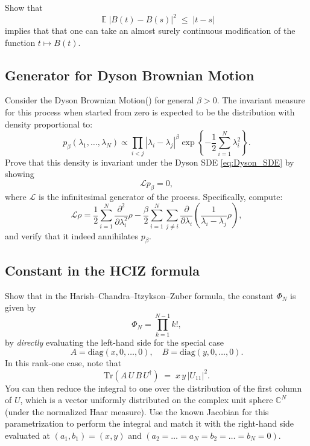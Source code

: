 \documentclass[letterpaper,11pt,oneside,reqno]{article}
\numberwithin{equation}{section}
\theoremstyle{definition}
\begin{document}
Show that
\begin{equation*}
	\operatorname{\mathbb{E}}|B(t)-B(s)|^2 \;\le\; |t-s|
\end{equation*}
implies that
that one can take an almost
surely continuous modification of the function $t\mapsto B(t)$.

\subsection{Generator for Dyson Brownian Motion}
\label{prob:generator}

Consider the Dyson Brownian Motion() for general $\beta > 0$. The invariant measure for this process when started from zero is expected to be the distribution with density proportional to:
\begin{equation*}
p_{\beta}(\lambda_1,\ldots,\lambda_N) \propto \prod_{i<j}|\lambda_i-\lambda_j|^{\beta} \exp\left\{-\frac{1}{2}\sum_{i=1}^N \lambda_i^2\right\}.
\end{equation*}
Prove that this density is invariant under the Dyson SDE \eqref{eq:Dyson_SDE} by showing
\begin{equation*}
\mathcal{L}p_{\beta} = 0,
\end{equation*}
where $\mathcal{L}$ is the infinitesimal generator of the process. Specifically, compute:
\begin{equation*}
\mathcal{L}\rho = \frac{1}{2}\sum_{i=1}^N
\frac{\partial^2}{\partial \lambda_i^2} \rho-
\frac{\beta}{2}\sum_{i=1}^N\sum_{j\neq
i}
\frac{\partial}{\partial\lambda_i}\left(
\frac{1}{\lambda_i-\lambda_j} \rho
\right),
\end{equation*}
and verify that it indeed annihilates $p_{\beta}$.

\subsection{Constant in the HCIZ formula}
\label{prob:PhiN}

Show that in the Harish--Chandra--Itzykson--Zuber formula, the constant $\Phi_N$ is given by
\[
   \Phi_N = \prod_{k=1}^{N-1} k!,
\]
by \emph{directly} evaluating the left-hand side for the special case
\[
   A=\mathrm{diag}(x,0,\dots,0),
   \quad
   B=\mathrm{diag}(y,0,\dots,0).
\]
In this rank-one case, note that
\[
   \mathrm{Tr}(A\,U\,B\,U^\dagger)
   \;=\;
   x\,y \,\bigl|U_{11}\bigr|^2.
\]
You can then reduce the integral to one over the distribution of the first column of $U$, 
which is a vector uniformly distributed on the complex unit sphere $\mathbb{C}^N$ (under the normalized Haar measure). 
Use the known Jacobian for this parametrization to perform the integral and match it with 
the right-hand side evaluated at $(a_1,b_1)=(x,y)$ and $(a_2=\dots=a_N=b_2=\dots=b_N=0)$.
\end{document}
